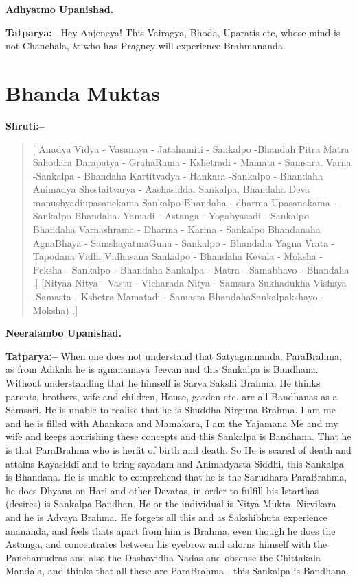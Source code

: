 \begin{flushright}
\textbf{Adhyatmo Upanishad.}
\end{flushright}

\textbf{Tatparya:–} Hey Anjeneya! This Vairagya, Bhoda, Uparatis etc, whose mind is not Chanchala, \& who has Pragney will experience Brahmananda.

\chapter{Bhanda Muktas}

\textbf{Shruti:–}

\begin{verse}
[ Anadya Vidya - Vasanaya - Jatahamiti - Sankalpo -\break Bhandah  Pitra Matra Sahodara Darapatya - Graha\break Rama - Kshetradi - Mamata - Samsara. Varna -\break Sankalpa - Bhandaha  Kartitvadya - Hankara -\break Sankalpo - Bhandaha  Animadya Shestaitvarya - Aasha\break sidda. Sankalpa, Bhandaha  Deva manushyadiupasane\break kama Sankalpo Bhandaha  - dharma Upasanakama - Sankalpo Bhandaha. Yamadi - Astanga - Yogabyasadi - Sankalpo Bhandaha  Varnashrama - Dharma - Karma - Sankalpo Bhandanaha  AgnaBhaya - SamshayatmaGuna - Sankalpo - Bhandaha  Yagna Vrata - Tapodana Vidhi Vidhasana Sankalpo - Bhandaha  Kevala - Moksha - Peksha - Sankalpo - Bhandaha  Sankalpa - Matra - Samabhavo - Bhandaha .] [Nityaa Nitya - Vastu - Vicharada Nitya - Samsara Sukhadukha Vishaya -\break Samasta - Kshetra Mamatadi - Samasta Bhandaha\break Sankalpakshayo - Moksha) .]
\end{verse}

\begin{flushright}
\textbf{Neeralambo Upanishad.}
\end{flushright}

\textbf{Tatparya:–} When one does not understand that Satyagnananda. ParaBrahma, as from Adikala he is agnanamaya Jeevan and this Sankalpa is Bandhana. Without understanding that he himself is Sarva Sakshi Brahma. He thinks parents, brothers, wife and children, House, garden etc. are all Bandhanas as a Samsari. He is unable to realise that he is Shuddha Nirguna Brahma. I am me and he is filled with Ahankara and Mamakara, I am the Yajamana Me and my wife and keeps nourishing these concepts and this Sankalpa is Bandhana. That he is that ParaBrahma who is herfit of birth and death. So He is scared of death and attains Kayasiddi and to bring sayadam and Animadyasta Siddhi, this Sankalpa is Bhandana. He is unable to comprehend that he is the Sarudhara ParaBrahma, he does Dhyana on Hari and other Devatas, in order to fulfill his Istarthas (desires) is Sankalpa Bandhan. He or the individual is Nitya Mukta, Nirvikara and he is Advaya Brahma. He forgets all this and as Sakshibhuta experience anananda, and feels thats apart from him is Brahma, even though he does the Astanga, and concentrates between his eyebrow and adorns himself with the Panchamudras and also the Dashavidha Nadas and obsense the Chittakala Mandala, and thinks that all these are ParaBrahma - this Sankalpa is Bandhana.

